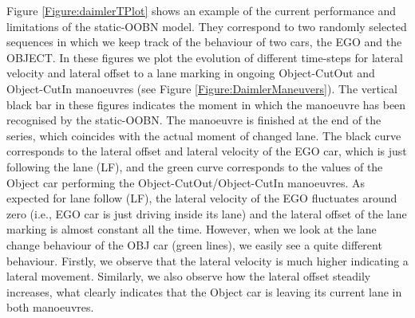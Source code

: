 Figure \ref{Figure:daimlerTPlot} shows an example of the current performance and limitations of the static-OOBN model. They correspond to two randomly selected sequences in which we keep track of the behaviour of two cars, the EGO and the OBJECT. In these figures we plot the evolution of different time-steps for lateral velocity and lateral offset to a lane marking in ongoing Object-CutOut and Object-CutIn manoeuvres (see Figure \ref{Figure:DaimlerManeuvers}). The vertical black bar in these figures indicates the moment in which the manoeuvre has been recognised by the static-OOBN. The manoeuvre is finished at the end of the series, which coincides with the actual moment of changed lane. The black curve corresponds to the lateral offset and lateral velocity of the EGO car, which is just following the lane (LF), and the green curve corresponds to the values of the Object car performing the Object-CutOut/Object-CutIn manoeuvres. As expected for lane follow (LF), the lateral velocity of the EGO fluctuates around zero  (i.e., EGO car is just driving inside its lane) and the lateral offset of the lane marking is almost constant all the time. However, when we look at the lane change behaviour of the OBJ car (green lines), we easily see a quite different behaviour. Firstly, we observe that the lateral velocity is much  higher indicating a lateral movement. Similarly, we also observe how the lateral offset steadily increases, what clearly indicates that the Object car is leaving its current lane in both manoeuvres. 

